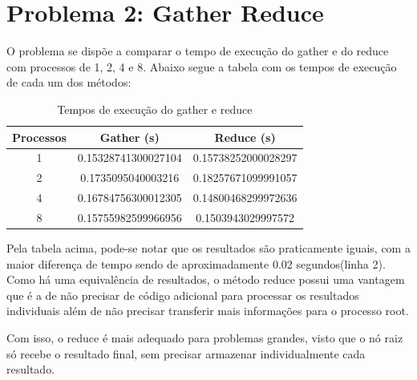\section{Problema 2: Gather Reduce}
O problema se dispõe a comparar o tempo de execução do gather e do reduce com processos de 1, 2, 4 e 8. Abaixo segue a tabela com os tempos de execução de cada um dos métodos:

\begin{table}[H]
\centering
\begin{tabular}{|c|c|c|}
\hline
\textbf{Processos} & \textbf{Gather (s)} & \textbf{Reduce (s)} \\ \hline
1 & 0.15328741300027104 & 0.15738252000028297 \\ \hline
2 & 0.1735095040003216  & 0.18257671099991057\\ \hline
4 & 0.16784756300012305 & 0.14800468299972636 \\ \hline
8 & 0.15755982599966956 & 0.1503943029997572 \\ \hline
\end{tabular}
\caption{Tempos de execução do gather e reduce}
\label{tab:tempos}
\end{table}

Pela tabela acima, pode-se notar que os resultados são praticamente iguais, com a maior diferença de tempo sendo de aproximadamente 0.02 segundos(linha 2). 
Como há uma equivalência de resultados, o método reduce possui uma vantagem que é a de não precisar de código adicional para processar os resultados individuais além de não precisar transferir mais informações para o processo root. 

Com isso, o reduce é mais adequado para problemas grandes, visto que o nó raiz só recebe o resultado final, sem precisar armazenar individualmente cada resultado. 
